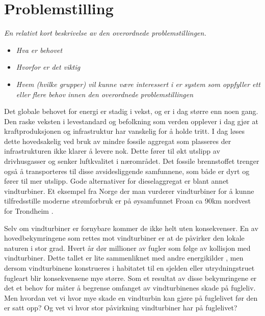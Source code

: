 \section{Problemstilling}
\label{sec:problemstilling}
\textit{En relativt kort beskrivelse av den overordnede problemstillingen.}
\begin{itemize}
\item \textit{Hva er behovet}
\item \textit{Hvorfor er det viktig}
\item \textit{Hvem (hvilke grupper) vil kunne være interessert i er system som oppfyller ett eller flere behov innen den overordnede problemstillingen}
\end{itemize}


Det globale behovet for energi er stadig i vekst, og er i dag større enn noen gang. Den raske veksten i levestandard og befolkning som verden opplever i dag gjør at kraftproduksjonen og infrastruktur har vanskelig for å holde tritt. I dag løses dette hovedsakelig ved bruk av mindre fossile aggregat som plasseres der infrastrukturen ikke klarer å levere nok. Dette fører til økt utslipp av drivhusgasser og senker luftkvalitet i nærområdet. Det fossile brennstoffet trenger også å transporteres til disse avsidesliggende samfunnene, som både er dyrt og fører til mer utslipp. Gode alternativer for dieselaggregat er blant annet vindturbiner. Et eksempel fra Norge der man vurderer vindturbiner for å kunne tilfredsstille moderne strømforbruk er på øysamfunnet Froan ca 90km nordvest for Trondheim \cite{AvisFroanVind}.


Selv om vindturbiner er fornybare kommer de ikke helt uten konsekvenser. En av hovedbekymringene som rettes mot vindturbiner er at de påvirker den lokale naturen i stor grad. Hvert år dør millioner av fugler som følge av kollisjon med vindturbiner\cite{dodfugler}. Dette tallet er lite sammenliknet med andre energikilder \cite{dodfugler}, men dersom vindturbinene konstrueres i habitatet til en sjelden eller utrydningstruet fugleart blir konsekvensene mye større. Som et resultat av disse bekymringene er det et behov for måter å begrense omfanget av vindturbinenes skade på fugleliv. Men hvordan vet vi hvor mye skade en vindturbin kan gjøre på fuglelivet før den er satt opp? Og vet vi hvor stor påvirkning vindturbiner har på fuglelivet?


